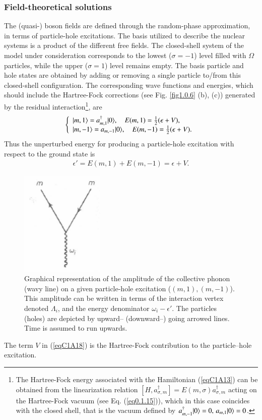 \subsubsection{Field-theoretical solutions}
 The (quasi-) boson fields are defined through the  random-phase
approximation, in terms of particle-hole excitations. The basis utilized to
describe the nuclear systems is a product of the different free fields. 
The closed-shell system of the  model under consideration corresponds to the lowest ($\sigma = - 1$) level filled with $\Omega$ particles, while the upper
($\sigma =  1$) level remains empty. The basis particle and hole states are obtained
by adding or removing a single particle to/from this closed-shell configuration.
The corresponding wave functions and energies, which should include the
Hartree-Fock corrections (see Fig. \ref{fig1.0.6} (b), (c)) generated by the residual interaction\footnote{The Hartree-Fock energy associated with the Hamiltonian (\ref{eqC1A13}) can be obtained
from the linearization relation $[H,a_{\sigma,m}^\dagger]=E(m,\sigma)a^\dagger_{\sigma,m}$ acting on the Hartree-Fock
vacuum (see Eq. (\ref{eq0.1.15})), which in this case coincides with the closed shell,  that is the vacuum defined by
 $a^\dagger_{m,-1}|{0} \rangle=0, \, a_{m,1}|{0} \rangle=0$.}, are
 \begin{align}\label{eqC1A17} 
\left\{\begin{array}{l}
 |{m,1} \rangle=a^\dagger_{m,1}|{0} \rangle,\quad E(m,1)=\frac{1}{2}(\epsilon+V),\\ 
|{m,-1} \rangle=a_{m,-1}|{0} \rangle,\quad E(m,-1)=\frac{1}{2}(\epsilon+V).
\end{array} \right.
 \end{align}
Thus the unperturbed energy for producing a particle-hole excitation with
respect to the ground state is
 \begin{align}\label{eqC1A18} 
\epsilon'=E(m,1)+E(m,-1)=\epsilon+V.
 \end{align}
 \begin{figure}
 \centerline {
 \includegraphics*[width=4cm]{introduccion/figs/fig18}
 }
 \caption{Graphical representation of the amplitude of the collective phonon (wavy line) on a given particle-hole excitation ($(m,1),(m,-1)$). This amplitude can be written in terms of the interaction vertex denoted  $\Lambda_i$, and the energy denominator $\omega_i-\epsilon'$. The particles (holes) are depicted by upward-- (downward--) going arrowed lines. Time is assumed to run upwards.}
 \label{figC1A1}
 \end{figure}
The term $V$ in (\ref{eqC1A18}) is the Hartree-Fock contribution to the particle--hole excitation.

